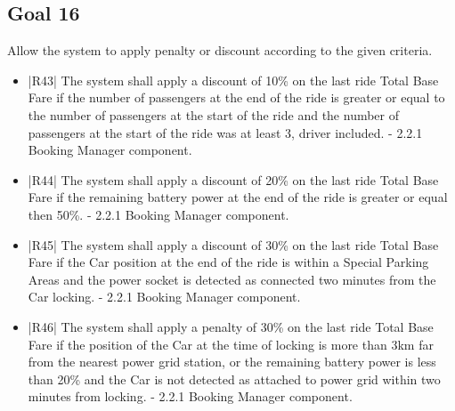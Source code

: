 \subsection {Goal 16} Allow the system to apply penalty or discount according to the given criteria.
\begin{itemize}
 \item |R43| The system shall apply a discount of 10\% on the last ride Total Base Fare if the number of passengers at the end of the ride is greater or equal to the number of passengers at the start of the ride and the number of passengers at the start of the ride was at least 3, driver included.
    \newline - 2.2.1 Booking Manager component.   
 \item |R44| The system shall apply a discount of 20\% on the last ride Total Base Fare if the remaining battery power at the end of the ride is greater or equal then 50\%.
    \newline - 2.2.1 Booking Manager component.
 \item |R45| The system shall apply a discount of 30\% on the last ride Total Base Fare if
the Car position at the end of the ride is within a Special Parking Areas and
the power socket is detected as connected two minutes from the Car locking.
    \newline - 2.2.1 Booking Manager component.
 \item |R46| The system shall apply a penalty of 30\% on the last ride Total Base Fare if the position of the Car at the time of locking is more than 3km far from the nearest power grid station, or the remaining battery power is less than 20\% and the Car is not detected as attached to power grid within two minutes from locking.
    \newline - 2.2.1 Booking Manager component.
\end{itemize}


